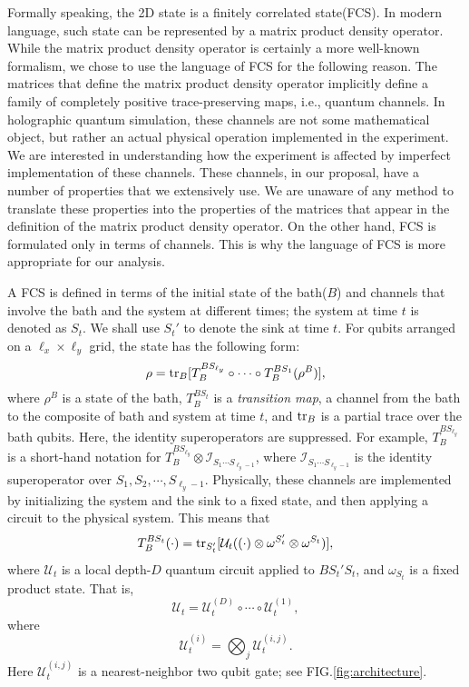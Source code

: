 \documentclass[prx,aps,amsmath,amssymb,floatfix,superscriptaddress,11pt,tightenlines,longbibliography,onecolumn,notitlepage]{revtex4-1}
\newcommand{\Tr}{\textnormal{tr}}
\begin{document}
Formally speaking, the 2D state is a finitely correlated state(FCS)\cite{Fannes1992}. In modern language, such state can be represented by a matrix product density operator\cite{Verstraete2004,Zwolak2004}. While the matrix product density operator is certainly a more well-known formalism, we chose to use the language of FCS for the following reason. The matrices that define the matrix product density operator implicitly define a family of completely positive trace-preserving maps\cite{Verstraete2004}, i.e., quantum channels. In holographic quantum simulation, these channels are not some mathematical object, but rather an actual physical operation implemented in the experiment. We are interested in understanding how the experiment is affected by imperfect implementation of these channels. These channels, in our proposal, have a number of properties that we extensively use. We are unaware of any method to translate these properties into the properties of the matrices that appear in the definition of the matrix product density operator. On the other hand, FCS is formulated only in terms of channels. This is why the language of FCS is more appropriate for our analysis.

A FCS is defined in terms of the initial state of the bath($B$) and channels that involve the bath and the system at different times; the system at time $t$ is denoted as $S_t$. We shall use $S_t'$ to denote the sink at time $t$. For qubits arranged on a $\ell_x \times \ell_y$ grid, the state has the following form:
\begin{equation}
\rho = \Tr_B[T_B^{BS_{\ell_y}} \circ \cdots \circ T_B^{BS_1}(\rho^B)], \label{eq:state}
\end{equation}
where $\rho^B$ is a state of the bath, $T_B^{BS_t}$ is a \emph{transition map}, a channel from the bath to the composite of bath and system at time $t$, and $\Tr_B$ is a partial trace over the bath qubits. Here, the identity superoperators are suppressed. For example, $T_B^{BS_{\ell_y}}$ is a short-hand notation for $T_B^{BS_{\ell_y}} \otimes \mathcal{I}_{S_1\cdots S_{\ell_y-1}}$, where $\mathcal{I}_{S_1\cdots S_{\ell_y-1}}$ is the identity superoperator over $S_1,S_2,\cdots, S_{\ell_y-1}$. Physically, these channels are implemented by initializing the system and the sink to a fixed state, and then applying a circuit to the physical system. This means that
\begin{equation}
  T_B^{BS_t}(\cdot) = \Tr_{S_t'}[\mathcal{U}_t((\cdot) \otimes \omega^{S_t'} \otimes \omega^{S_t})],
  \label{eq:def1}
\end{equation}
where  $\mathcal{U}_t$ is a local depth-$D$ quantum circuit applied to $BS_t'S_t$, and $\omega_{S_t}$ is a fixed product state. That is,
\begin{equation}
\mathcal{U}_t = \mathcal{U}_t^{(D)} \circ \cdots \circ \mathcal{U}_t^{(1)},\label{eq:def2}
\end{equation}
where
\begin{equation}
\mathcal{U}_t^{(i)} = \bigotimes_j \mathcal{U}_t^{(i,j)}.\label{eq:def3}
\end{equation}
Here $\mathcal{U}_{t}^{(i,j)}$ is a nearest-neighbor two qubit gate; see FIG.\ref{fig:architecture}.
\end{document}
